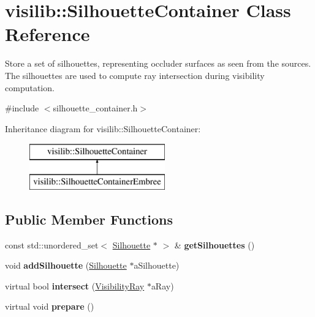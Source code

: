 \hypertarget{classvisilib_1_1_silhouette_container}{}\section{visilib\+::Silhouette\+Container Class Reference}
\label{classvisilib_1_1_silhouette_container}


Store a set of silhouettes, representing occluder surfaces as seen from the sources. The silhouettes are used to compute ray intersection during visibility computation.  




{\ttfamily \#include $<$silhouette\+\_\+container.\+h$>$}

Inheritance diagram for visilib\+::Silhouette\+Container\+:\begin{figure}[H]
\begin{center}
\leavevmode
\includegraphics[height=2.000000cm]{classvisilib_1_1_silhouette_container}
\end{center}
\end{figure}
\subsection*{Public Member Functions}
\begin{DoxyCompactItemize}
\item 
\mbox{\label{classvisilib_1_1_silhouette_container_a7c42eff193b69bd62532c1b723700901}} 
const std\+::unordered\+\_\+set$<$ \mbox{\hyperlink{classvisilib_1_1_silhouette}{Silhouette}} $\ast$ $>$ \& {\bfseries get\+Silhouettes} ()
\item 
\mbox{\label{classvisilib_1_1_silhouette_container_a5a9047d08292878caf0d4cea6107122f}} 
void {\bfseries add\+Silhouette} (\mbox{\hyperlink{classvisilib_1_1_silhouette}{Silhouette}} $\ast$a\+Silhouette)
\item 
\mbox{\label{classvisilib_1_1_silhouette_container_a680d7185898724a3dbebcc8268a51b80}} 
virtual bool {\bfseries intersect} (\mbox{\hyperlink{structvisilib_1_1_visibility_ray}{Visibility\+Ray}} $\ast$a\+Ray)
\item 
\mbox{\label{classvisilib_1_1_silhouette_container_a83c0a6a3517e09446d8f145a3f58eda7}} 
virtual void {\bfseries prepare} ()
\end{DoxyCompactItemize}
